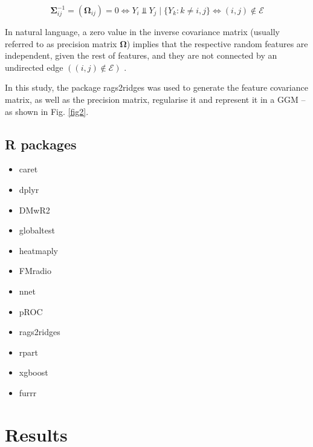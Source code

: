 \documentclass{amsart}
\begin{document}
\[ \mathbf{\Sigma}_{ij}^{-1} = (\mathbf{\Omega}_{ij})=0 \Longleftrightarrow Y_i \Perp Y_j\mid\{Y_k : k \neq i,j\} \Longleftrightarrow (i, j) \notin \mathcal{E} \]

In natural language, a zero value in the inverse covariance matrix (usually referred to as precision matrix $\mathbf{\Omega}$) implies that the respective random features are independent, given the rest of features, and they are not connected by an undirected edge $((i, j) \notin \mathcal{E})$ \cite{Peeters2022Rags2ridges:Matrices}.

In this study, the package \textsf{rags2ridges} \cite{Peeters2022Rags2ridges:Matrices} was used to generate the feature covariance matrix, as well as the precision matrix, regularise it and represent it in a GGM --as shown in Fig. \ref{fig2}.

\subsection{R packages} \label{packages}
\hspace{5 pt}
\begin{multicols}{3}
\begin{itemize}
    \item[] \textsf{caret} \cite{Kuhn2008BuildingPackage}
    \item[]\textsf{dplyr} \cite{dplyr}
    \item[]\textsf{DMwR2} \cite{DMwR2}
    \item[]\textsf{globaltest} \cite{Goeman2004AOutcome, Goeman2006TestingAlternative, Goeman2023ThePackage}
    \item[]\textsf{heatmaply} \cite{heatmaply}
    \item[]\textsf{FMradio} \cite{Peeters2019StableData}
    \item[]\textsf{nnet} \cite{nnet}
    \item[]\textsf{pROC} \cite{pROC}
    \item[]\textsf{rags2ridges} \cite{Peeters2022Rags2ridges:Matrices}
    \item[]\textsf{rpart} \cite{rpart}
    \item[]\textsf{xgboost} \cite{Chen2016XGBoost:System}
    \item[]\textsf{furrr} \cite{furrr}
\end{itemize}
\end{multicols}

\clearpage
\section{Results} \label{results}
\end{document}
